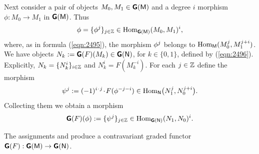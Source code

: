 Next consider a pair of objects $M_0, M_1 \in \boldsymbol{\mathsf{G}}(\operatorname{\mathsf{M}})$
and a degree $i$ morphism 
$\phi : M_0 \to M_1$ in $\boldsymbol{\mathsf{G}}(\operatorname{\mathsf{M}})$. Thus 
\[ \phi = \{ \phi^{ j} \}_{j \in \mathbb{Z}} \in 
\operatorname{Hom}_{\boldsymbol{\mathsf{G}}(\operatorname{\mathsf{M}})}(M_0, M_1)^i , \]
where, as in formula (\ref{eqn:2495}), the morphism $\phi^{ j}$ belongs to 
$\operatorname{Hom}_{\operatorname{\mathsf{M}}}(M_0^j, M_1^{j + i})$.
We have objects 
$N_k := \boldsymbol{\mathsf{G}}(F)(M_k) \in \boldsymbol{\mathsf{G}}(\operatorname{\mathsf{N}})$,
for $k \in \{ 0, 1 \}$, defined by (\ref{eqn:2496}). Explicitly, 
$N_k = \{ N_k^i \}_{i \in \mathbb{Z}}$ and $N_k^i = F(M_k^{-i})$. 
For each $j \in \mathbb{Z}$ define the morphism 
\begin{equation} \label{eqn:2505}
\psi^{ j} := (-1)^{i \mspace{1.5mu}{\cdot}\mspace{1.5mu} j} \mspace{1.5mu}{\cdot}\mspace{1.5mu} F(\phi^{-j - i}) \in
\operatorname{Hom}_{\operatorname{\mathsf{N}}} \bigl( N_1^j, N_0^{j + i} \bigr) .
\end{equation}
Collecting them we obtain a morphism 
\begin{equation} \label{eqn:2497}
\boldsymbol{\mathsf{G}}(F)(\phi) := \{ \psi^{ j} \}_{j \in \mathbb{Z}}  \in 
\operatorname{Hom}_{\boldsymbol{\mathsf{G}}(\operatorname{\mathsf{N}})}(N_1, N_0)^i . 
\end{equation}

\begin{lem} \label{lem:2495}
The assignments \tup{(\ref{eqn:2496})} and \tup{(\ref{eqn:2497})}
produce a contravariant graded functor 
$\boldsymbol{\mathsf{G}}(F) : \boldsymbol{\mathsf{G}}(\operatorname{\mathsf{M}}) \to \boldsymbol{\mathsf{G}}(\operatorname{\mathsf{N}})$.
\end{lem}

